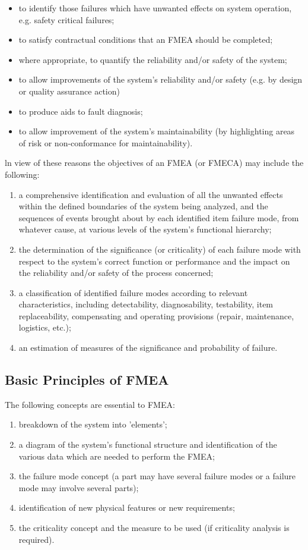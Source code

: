 \documentclass[./dissertation.tex]{subfiles}
\begin{document}
\begin{itemize}
    \item to identify those failures which have unwanted effects on system operation, e.g. safety critical failures;
    \item to satisfy contractual conditions that an FMEA should be completed;
    \item where appropriate, to quantify the reliability and/or safety of the system;
    \item to allow improvements of the system's reliability and/or safety (e.g. by design or quality assurance action)
    \item to produce aids to fault diagnosis;
    \item to allow improvement of the system's maintainability (by highlighting areas of risk or non-conformance for maintainability).
\end{itemize}

ln view of these reasons the objectives of an FMEA (or FMECA) may include the following: 

\begin{enumerate}
    \item a comprehensive identification and evaluation of all the unwanted effects within the defined boundaries of the system being analyzed, and the sequences of events brought about by each identified item failure mode, from whatever cause, at various levels of the system's functional hierarchy;
    \item the determination of the significance (or criticality) of each failure mode with respect to the system's correct function or performance and the impact on the reliability and/or safety of the process concerned;
    \item a classification of identified failure modes according to relevant characteristics, including detectability, diagnosability, testability, item replaceability, compensating and operating provisions (repair, maintenance, logistics, etc.);
    \item an estimation of measures of the significance and probability of failure.
\end{enumerate}


\subsection{Basic Principles of FMEA}
The following concepts are essential to FMEA:

\begin{enumerate}
    \item breakdown of the system into 'elements';
    \item a diagram of the system's functional structure and identification of the various data which are needed to perform the FMEA;
    \item the failure mode concept (a part may have several failure modes or a failure mode may involve several parts);
    \item identification of new physical features or new requirements;
    \item the criticality concept and the measure to be used (if criticality analysis is required).
\end{enumerate}
\end{document}
